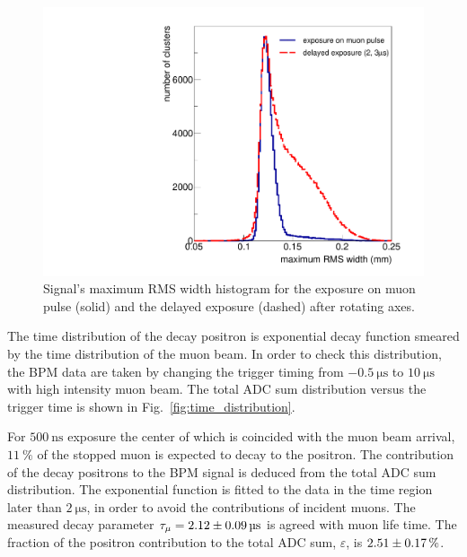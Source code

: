 \documentclass[preprint,3p,twocolumn]{elsarticle}
\begin{document}
\begin{figure}[tb]
	\begin{minipage}[t]{60mm}
		\includegraphics[width=1.30\textwidth, height=1.1\textwidth]{figure/RMS_legend_v2.pdf}
	\end{minipage}
	\caption{Signal's maximum RMS width histogram for the exposure on muon pulse (solid) and the delayed exposure (dashed) after rotating axes.}
	\label{fig:positron_width}
\end{figure}
The time distribution of the decay positron is exponential decay function smeared by the time distribution of the muon beam. In order to check this distribution, the BPM data are taken by changing the trigger timing from $\SI{-0.5}{\micro\s}$ to $\SI{10}{\micro\s}$ with high intensity muon beam. The total ADC sum distribution versus the trigger time is shown in Fig.~\ref{fig:time_distribution}.

For $\SI{500}{\nano\s}$ exposure the center of which is coincided with the muon beam arrival, $\SI{11}{\percent}$ of the stopped muon is expected to decay to the positron. The contribution of the decay positrons to the BPM signal is deduced from the total ADC sum distribution. The exponential function is fitted to the data in the time region later than $\SI{2}{\micro\s}$, in order to avoid the contributions of incident muons. The measured decay parameter $\tau_{\mu}=\SI{2.12 \pm 0.09}{\micro\s}$ is agreed with muon life time. The fraction of the positron contribution to the total ADC sum, $\varepsilon$, is $\SI{2.51\pm0.17}{\percent}$.
\end{document}
